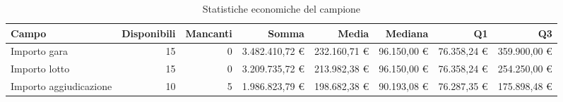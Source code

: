 \begin{table}[htbp]
\centering
\small
\caption{Statistiche economiche del campione}
\begin{tabular}{lrrrrrrr}
\toprule
Campo & Disponibili & Mancanti & Somma & Media & Mediana & Q1 & Q3 \\
\midrule
Importo gara & 15 & 0 & 3.482.410,72 € & 232.160,71 € & 96.150,00 € & 76.358,24 € & 359.900,00 € \\
Importo lotto & 15 & 0 & 3.209.735,72 € & 213.982,38 € & 96.150,00 € & 76.358,24 € & 254.250,00 € \\
Importo aggiudicazione & 10 & 5 & 1.986.823,79 € & 198.682,38 € & 90.193,08 € & 76.287,35 € & 175.898,48 € \\
\bottomrule
\end{tabular}
\end{table}
